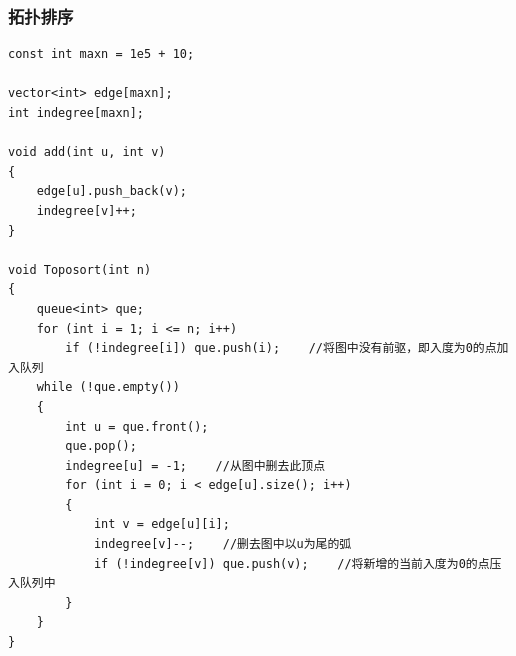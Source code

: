 \documentclass[twoside]{article}
\begin{document}
\subsubsection{拓扑排序}
\begin{lstlisting}
const int maxn = 1e5 + 10;

vector<int> edge[maxn];
int indegree[maxn];

void add(int u, int v)
{
    edge[u].push_back(v);
    indegree[v]++;
}

void Toposort(int n)
{
    queue<int> que;
    for (int i = 1; i <= n; i++)
        if (!indegree[i]) que.push(i);    //将图中没有前驱，即入度为0的点加入队列
    while (!que.empty())
    {
        int u = que.front();
        que.pop();
        indegree[u] = -1;    //从图中删去此顶点	
        for (int i = 0; i < edge[u].size(); i++)
        {
            int v = edge[u][i];
            indegree[v]--;    //删去图中以u为尾的弧
            if (!indegree[v]) que.push(v);    //将新增的当前入度为0的点压入队列中
        }
    }
}\end{lstlisting}
\end{document}
